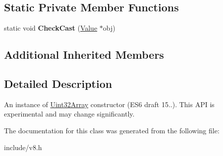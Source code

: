 \subsection*{Static Private Member Functions}
\begin{DoxyCompactItemize}
\item 
static void {\bfseries Check\+Cast} (\hyperlink{classv8_1_1_value}{Value} $\ast$obj)\hypertarget{classv8_1_1_uint32_array_a3f9865178ac4e1f468bafb0e47c9b910}{}\label{classv8_1_1_uint32_array_a3f9865178ac4e1f468bafb0e47c9b910}

\end{DoxyCompactItemize}
\subsection*{Additional Inherited Members}


\subsection{Detailed Description}
An instance of \hyperlink{classv8_1_1_uint32_array}{Uint32\+Array} constructor (E\+S6 draft 15..). This A\+PI is experimental and may change significantly. 

The documentation for this class was generated from the following file\+:\begin{DoxyCompactItemize}
\item 
include/v8.\+h\end{DoxyCompactItemize}
